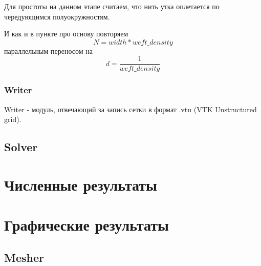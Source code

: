 Для простоты на данном этапе считаем, что нить утка оплетается по чередующимся полуокружностям.

И как и в пункте про основу повторяем
\[
    N = width * weft\_density
\]
параллельным переносом на
\[
    d = \frac{1}{weft\_density}
\]

\subsubsection*{Writer}
Writer - модуль, отвечающий за запись сетки в формат .vtu (VTK Unstructured grid).


\subsection*{Solver}

\section*{Численные результаты}

\section*{Графические результаты}

\subsection*{Mesher}
